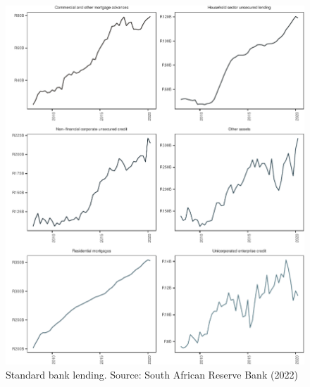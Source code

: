\documentclass[
]{article}
\begin{document}
\begin{figure}[H]

\includegraphics{Bank_capital_and_bank_lending_files/figure-latex/ba900standard-1} \hfill{}

\caption{Standard bank lending. Source: South African Reserve Bank (2022) }\label{fig:ba900standard}
\end{figure}
\end{document}
